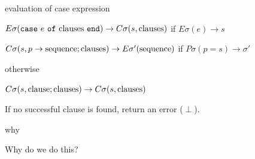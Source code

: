 \begin{frame}{evaluation of case expression}
 
$E\sigma({\tt case}\ e \ {\tt of}\ {\rm clauses} \ {\tt end}) \rightarrow C\sigma(s, {\rm clauses})$ if $ E\sigma(e) \rightarrow s$

\pause\vspace{10pt}
$C\sigma(s, p \rightarrow  {\rm sequence} ; {\rm clauses}) \rightarrow E\sigma'({\rm sequence})$ if $P\sigma(p = s) \rightarrow \sigma'$

\pause\vspace{10pt}otherwise 

\pause\vspace{10pt}
$C\sigma(s, {\rm clause} ; {\rm clauses}) \rightarrow C\sigma(s, {\rm clauses})$ 

\pause\vspace{20pt}
If no successful clause is found, return an error ($\perp$).

\end{frame}


\begin{frame}{why}

\pause\vspace{40pt}\hspace{60pt}Why do we do this?

\end{frame}


